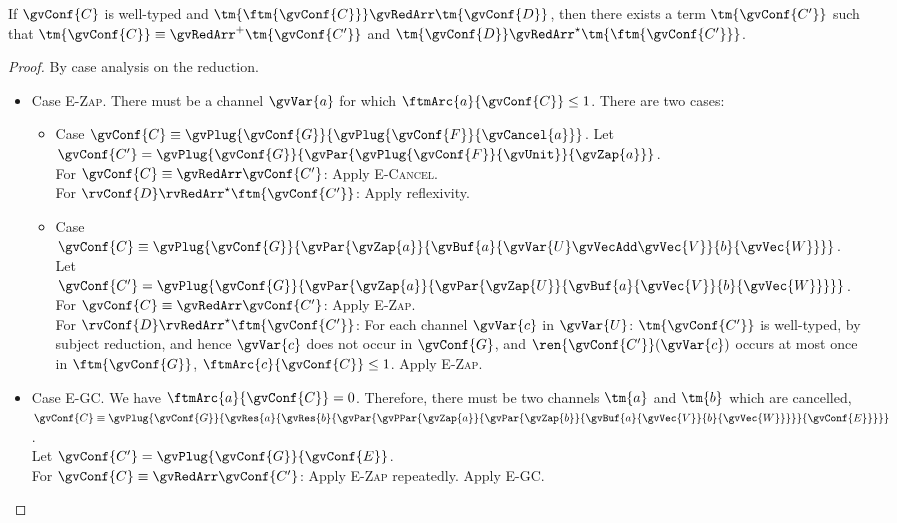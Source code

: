 \begin{theorem}
  If $\gvConf{C}$ is well-typed and $\tm{\ftm{\gvConf{C}}}\gvRedArr\tm{\gvConf{D}}$, then there exists a term $\tm{\gvConf{C'}}$ such that $\tm{\gvConf{C}}\equiv\gvRedArr^{+}\tm{\gvConf{C'}}$ and $\tm{\gvConf{D}}\gvRedArr^{\star}\tm{\ftm{\gvConf{C'}}}$.
\end{theorem}
\begin{proof}
  By case analysis on the reduction.
  \begin{itemize}
  \item
    Case \textsc{E-Zap}. There must be a channel $\gvVar{a}$ for which $\ftmArc{a}{\gvConf{C}}\le{1}$. There are two cases:
    \begin{itemize}
    \item 
      Case $\gvConf{C}\equiv\gvPlug{\gvConf{G}}{\gvPlug{\gvConf{F}}{\gvCancel{a}}}$. Let $\gvConf{C'}=\gvPlug{\gvConf{G}}{\gvPar{\gvPlug{\gvConf{F}}{\gvUnit}}{\gvZap{a}}}$. \\ For $\gvConf{C}\equiv\gvRedArr\gvConf{C'}$: Apply \textsc{E-Cancel}. \\ For $\rvConf{D}\rvRedArr^{\star}\ftm{\gvConf{C'}}$: Apply reflexivity.
    \item
      Case $\gvConf{C}\equiv\gvPlug{\gvConf{G}}{\gvPar{\gvZap{a}}{\gvBuf{a}{\gvVar{U}\gvVecAdd\gvVec{V}}{b}{\gvVec{W}}}}$. \\ Let $\gvConf{C'} = \gvPlug{\gvConf{G}}{\gvPar{\gvZap{a}}{\gvPar{\gvZap{U}}{\gvBuf{a}{\gvVec{V}}{b}{\gvVec{W}}}}}$. \\ For $\gvConf{C}\equiv\gvRedArr\gvConf{C'}$: Apply \textsc{E-Zap}. \\ For $\rvConf{D}\rvRedArr^{\star}\ftm{\gvConf{C'}}$: For each channel $\gvVar{c}$ in $\gvVar{U}$: $\tm{\gvConf{C'}}$ is well-typed, by subject reduction, and hence $\gvVar{c}$ does not occur in $\gvConf{G}$, and $\ren{\gvConf{C'}}(\gvVar{c})$ occurs at most once in $\ftm{\gvConf{G}}$, \ie $\ftmArc{c}{\gvConf{C}}\le{1}$. Apply \textsc{E-Zap}.
    \end{itemize}
  \item
    Case \textsc{E-GC}. We have $\ftmArc{a}{\gvConf{C}}=0$. Therefore, there must be two channels $\tm{a}$ and $\tm{b}$ which are cancelled, \ie $\gvConf{C}\equiv\gvPlug{\gvConf{G}}{\gvRes{a}{\gvRes{b}{\gvPar{\gvPPar{\gvZap{a}}{\gvPar{\gvZap{b}}{\gvBuf{a}{\gvVec{V}}{b}{\gvVec{W}}}}}{\gvConf{E}}}}}$. \\ Let $\gvConf{C'}=\gvPlug{\gvConf{G}}{\gvConf{E}}$. \\
    For $\gvConf{C}\equiv\gvRedArr\gvConf{C'}$: Apply \textsc{E-Zap} repeatedly. Apply \textsc{E-GC}. \\

\end{itemize}
\end{proof}
